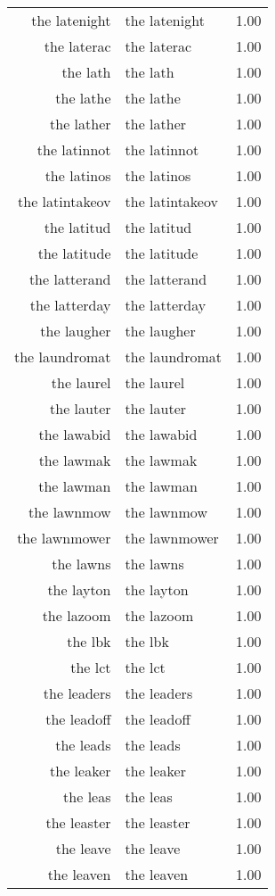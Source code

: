 \begin{table}[ht]
\begin{tabular}{rlr}
  the latenight & the latenight & 1.00 \\ 
  the laterac & the laterac & 1.00 \\ 
  the lath & the lath & 1.00 \\ 
  the lathe & the lathe & 1.00 \\ 
  the lather & the lather & 1.00 \\ 
  the latinnot & the latinnot & 1.00 \\ 
  the latinos & the latinos & 1.00 \\ 
  the latintakeov & the latintakeov & 1.00 \\ 
  the latitud & the latitud & 1.00 \\ 
  the latitude & the latitude & 1.00 \\ 
  the latterand & the latterand & 1.00 \\ 
  the latterday & the latterday & 1.00 \\ 
  the laugher & the laugher & 1.00 \\ 
  the laundromat & the laundromat & 1.00 \\ 
  the laurel & the laurel & 1.00 \\ 
  the lauter & the lauter & 1.00 \\ 
  the lawabid & the lawabid & 1.00 \\ 
  the lawmak & the lawmak & 1.00 \\ 
  the lawman & the lawman & 1.00 \\ 
  the lawnmow & the lawnmow & 1.00 \\ 
  the lawnmower & the lawnmower & 1.00 \\ 
  the lawns & the lawns & 1.00 \\ 
  the layton & the layton & 1.00 \\ 
  the lazoom & the lazoom & 1.00 \\ 
  the lbk & the lbk & 1.00 \\ 
  the lct & the lct & 1.00 \\ 
  the leaders & the leaders & 1.00 \\ 
  the leadoff & the leadoff & 1.00 \\ 
  the leads & the leads & 1.00 \\ 
  the leaker & the leaker & 1.00 \\ 
  the leas & the leas & 1.00 \\ 
  the leaster & the leaster & 1.00 \\ 
  the leave & the leave & 1.00 \\ 
  the leaven & the leaven & 1.00 \\ 

\end{tabular}
\end{table}
